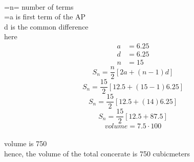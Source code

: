 \documentclass[journal,12pt,twocolumn]{IEEEtran}
\theoremstyle{remark}
\begin{document}
\\=n= number of terms
\\=a is  first term of the AP
\\d is the common difference
\\here\begin{align}
a&= 6.25
\\d&=6.25  
\\n&=15
\end{align}
\[
S_n = \frac{n}{2} [2a+(n-1)d]
\]
\[
S_n = \frac{15}{2} [12.5+(15-1)6.25]
\]
\[
S_n = \frac{15}{2} [12.5+(14)6.25]
\]
\[
S_n = \frac{15}{2} [12.5+87.5]
\]
\[{{volume}}=7.5 \cdot 100
\]
\\    volume is  750
\\hence, the volume of the total concerate is 750 cubicmeters
 
\end{document}
